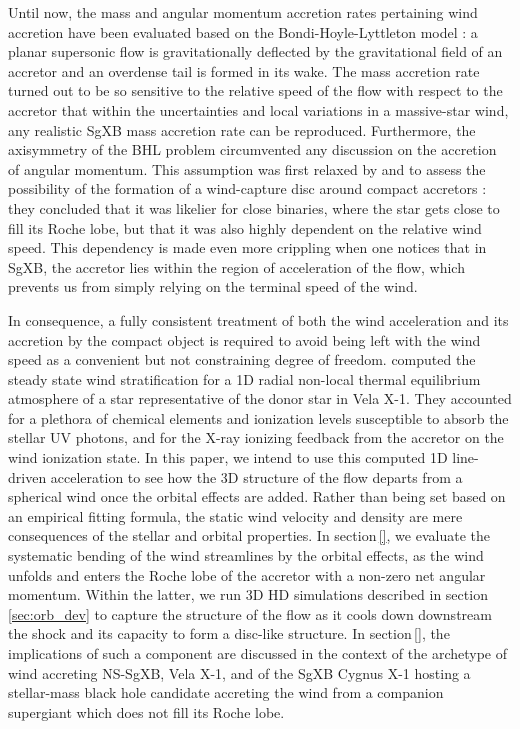 \documentclass{aa}
\makeatletter
\newcommand{\sgx}{SgXB\xspace}
\newcommand*{\ns}{NS\@\xspace}
\makeatother
\begin{document}
Until now, the mass and angular momentum accretion rates pertaining wind accretion have been evaluated based on the Bondi-Hoyle-Lyttleton model \citep[BHL, see][for a review]{Edgar:2004ip} : a planar supersonic flow is gravitationally deflected by the gravitational field of an accretor and an overdense tail is formed in its wake. The mass accretion rate turned out to be so sensitive to the relative speed of the flow with respect to the accretor that within the uncertainties and local variations in a massive-star wind, any realistic \sgx mass accretion rate can be reproduced. Furthermore, the axisymmetry of the BHL problem circumvented any discussion on the accretion of angular momentum. This assumption was first relaxed by \cite{Illarionov1975} and \cite{Shapiro1976} to assess the possibility of the formation of a wind-capture disc around compact accretors : they concluded that it was likelier for close binaries, where the star gets close to fill its Roche lobe, but that it was also highly dependent on the relative wind speed. This dependency is made even more crippling when one notices that in \sgx, the accretor lies within the region of acceleration of the flow, which prevents us from simply relying on the terminal speed of the wind.

In consequence, a fully consistent treatment of both the wind acceleration and its accretion by the compact object is required to avoid being left with the wind speed as a convenient but not constraining degree of freedom. \cite{Sander2017} computed the steady state wind stratification for a 1D radial non-local thermal equilibrium atmosphere of a star representative of the donor star in Vela X-1. They accounted for a plethora of chemical elements and ionization levels susceptible to absorb the stellar UV photons, and for the X-ray ionizing feedback from the accretor on the wind ionization state. In this paper, we intend to use this computed 1D line-driven acceleration to see how the 3D structure of the flow departs from a spherical wind once the orbital effects are added. Rather than being set based on an empirical fitting formula, the static wind velocity and density are mere consequences of the stellar and orbital properties. In section\,\ref{}, we evaluate the systematic bending of the wind streamlines by the orbital effects, as the wind unfolds and enters the Roche lobe of the accretor with a non-zero net angular momentum. Within the latter, we run 3D HD simulations described in section\,\ref{sec:orb_dev} to capture the structure of the flow as it cools down downstream the shock and its capacity to form a disc-like structure. In section\,\ref{}, the implications of such a component are discussed in the context of the archetype of wind accreting \ns-\sgx, Vela X-1, and of the \sgx Cygnus X-1 hosting a stellar-mass black hole candidate accreting the wind from a companion supergiant which does not fill its Roche lobe. 
\end{document}
